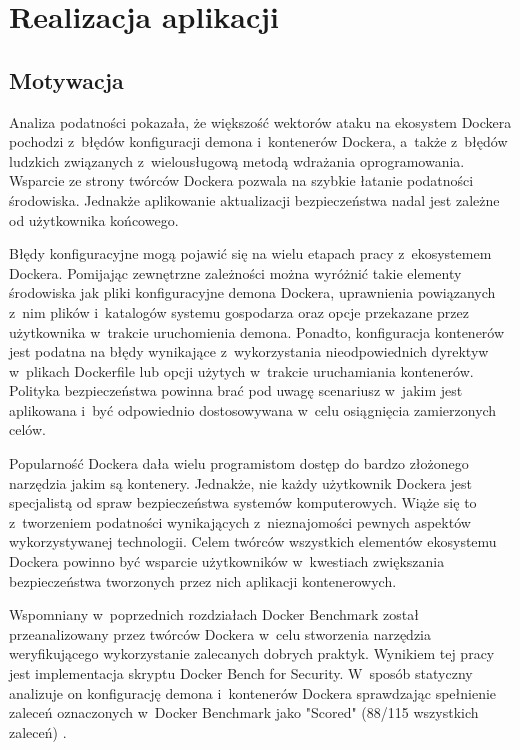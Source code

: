 \chapter{Realizacja aplikacji}

\section{Motywacja}

Analiza podatności pokazała, że większość wektorów ataku na ekosystem Dockera pochodzi z~błędów konfiguracji demona i~kontenerów Dockera, a~także z~błędów ludzkich związanych z~wielousługową metodą wdrażania oprogramowania. Wsparcie ze strony twórców Dockera pozwala na szybkie łatanie podatności środowiska. Jednakże aplikowanie aktualizacji bezpieczeństwa nadal jest zależne od użytkownika końcowego.

Błędy konfiguracyjne mogą pojawić się na wielu etapach pracy z~ekosystemem Dockera. Pomijając zewnętrzne zależności można wyróżnić takie elementy środowiska jak pliki konfiguracyjne demona Dockera, uprawnienia powiązanych z~nim plików i~katalogów systemu gospodarza oraz opcje przekazane przez użytkownika w~trakcie uruchomienia demona. Ponadto, konfiguracja kontenerów jest podatna na błędy wynikające z~wykorzystania nieodpowiednich dyrektyw w~plikach Dockerfile lub opcji użytych w~trakcie uruchamiania kontenerów. Polityka bezpieczeństwa powinna brać pod uwagę scenariusz w~jakim jest aplikowana i~być odpowiednio dostosowywana w~celu osiągnięcia zamierzonych celów.

Popularność Dockera dała wielu programistom dostęp do bardzo złożonego narzędzia jakim są kontenery. Jednakże, nie każdy użytkownik Dockera jest specjalistą od spraw bezpieczeństwa systemów komputerowych. Wiąże się to z~tworzeniem podatności wynikających z~nieznajomości pewnych aspektów wykorzystywanej technologii. Celem twórców wszystkich elementów ekosystemu Dockera powinno być wsparcie użytkowników w~kwestiach zwiększania bezpieczeństwa tworzonych przez nich aplikacji kontenerowych. 

Wspomniany w~poprzednich rozdziałach Docker Benchmark \cite{CISDockerBenchmark} został przeanalizowany przez twórców Dockera w~celu stworzenia narzędzia weryfikującego wykorzystanie zalecanych dobrych praktyk. Wynikiem tej pracy jest implementacja skryptu Docker Bench for Security. W~sposób statyczny analizuje on konfigurację demona i~kontenerów Dockera sprawdzając spełnienie zaleceń oznaczonych w~Docker Benchmark jako "Scored" (88/115 wszystkich zaleceń) \cite{DockerBenchSecurity}.

